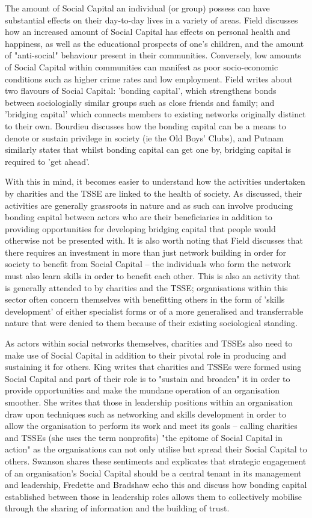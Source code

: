 The amount of Social Capital an individual (or group) possess can have substantial effects on their day-to-day lives in a variety of areas. Field discusses how an increased amount of Social Capital has effects on personal health and happiness, as well as the educational prospects of one's children, and the amount of "anti-social" behaviour present in their communities. Conversely, low amounts of Social Capital within communities can manifest as poor socio-economic conditions such as higher crime rates and low employment. Field writes about two flavours of Social Capital: 'bonding capital', which strengthens bonds between sociologially similar groups such as close friends and family; and 'bridging capital' which connects members to existing networks originally distinct to their own. Bourdieu discusses how the bonding capital can be a means to denote or sustain privilege in society (ie the Old Boys' Clubs), and Putnam similarly states that whilst bonding capital can get one by, bridging capital is required to 'get ahead'.

With this in mind, it becomes easier to understand how the activities undertaken by charities and the TSSE are linked to the health of society. As discussed, their activities are generally grassroots in nature and as such can involve producing bonding capital between actors who are their beneficiaries in addition to providing opportunities for developing bridging capital that people would otherwise not be presented with. It is also worth noting that Field discusses that there requires an investment in more than just network building in order for society to benefit from Social Capital -- the individuals who form the network must also learn skills in order to benefit each other. This is also an activity that is generally attended to by charities and the TSSE; organisations within this sector often concern themselves with benefitting others in the form of 'skills development' of either specialist forms or of a more generalised and transferrable nature that were denied to them because of their existing sociological standing.

As actors within social networks themselves, charities and TSSEs also need to make use of Social Capital in addition to their pivotal role in producing and sustaining it for others. King writes that charities and TSSEs were formed using Social Capital and part of their role is to "sustain and broaden" it in order to provide opportunities and make the mundane operation of an organisation smoother. She writes that those in leadership positions within an organisation draw upon techniques such as networking and skills development in order to allow the organisation to perform its work and meet its goals -- calling charities and TSSEs (she uses the term nonprofits) "the epitome of Social Capital in action" as the organisations can not only utilise but spread their Social Capital to others. Swanson shares these sentiments and explicates that strategic engagement of an organisation's Social Capital should be a central tenant in its management and leadership, Fredette and Bradshaw echo this and discuss how bonding capital established between those in leadership roles allows them to collectively mobilise through the sharing of information and the building of trust.

